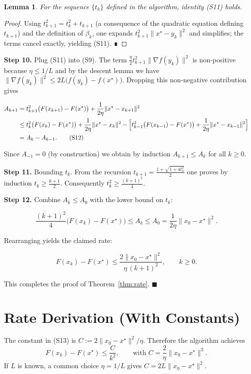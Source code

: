 \documentclass{article}
\newtheorem{lemma}{Lemma}
\begin{document}
\begin{lemma}\label{lem:aux}
For the sequence $\{t_k\}$ defined in the algorithm, identity (S11) holds.
\end{lemma}
\begin{proof}
Using $t_{k+1}^{2}=t_k^{2}+t_{k+1}$ (a consequence of the quadratic equation defining $t_{k+1}$) and the definition of $\beta_k$, one expands $t_{k+1}^{2}\|x^\star-y_k\|^{2}$ and simplifies; the terms cancel exactly, yielding (S11).  ∎
\end{proof}

\noindent\textbf{Step 10.} Plug (S11) into (S9).  The term $\frac{\eta}{2}t_{k+1}^{2}\|\nabla f(y_k)\|^{2}$ is non‑positive because $\eta\le 1/L$ and by the descent lemma we have $\|\nabla f(y_k)\|^{2}\le 2L\bigl(f(y_k)-f(x^\star)\bigr)$.  Dropping this non‑negative contribution gives

\[
\begin{aligned}
A_{k+1}
&=t_{k+1}^{2}\bigl(F(x_{k+1})-F(x^\star)\bigr)
   +\frac{1}{2\eta}\|x^\star-x_{k+1}\|^{2}\\
&\le t_k^{2}\bigl(F(x_k)-F(x^\star)\bigr)
   +\frac{1}{2\eta}\|x^\star-x_k\|^{2}
   -\Bigl[t_{k-1}^{2}\bigl(F(x_{k-1})-F(x^\star)\bigr)
   +\frac{1}{2\eta}\|x^\star-x_{k-1}\|^{2}\Bigr] \\
&= A_k - A_{k-1}. \tag{S12}
\end{aligned}
\]

Since $A_{-1}=0$ (by construction) we obtain by induction $A_{k+1}\le A_k$ for all $k\ge0$.

\noindent\textbf{Step 11.} Bounding $t_k$.  From the recursion $t_{k+1}=\frac{1+\sqrt{1+4t_k^{2}}}{2}$ one proves by induction $t_k\ge \frac{k+1}{2}$.  Consequently $t_k^{2}\ge \frac{(k+1)^{2}}{4}$.

\noindent\textbf{Step 12.} Combine $A_k\le A_0$ with the lower bound on $t_k$:

\[
\frac{(k+1)^{2}}{4}\bigl(F(x_k)-F(x^\star)\bigr)
\le A_k\le A_0=\frac{1}{2\eta}\|x_0-x^\star\|^{2}.
\]

Rearranging yields the claimed rate:

\[
F(x_k)-F(x^\star)\le\frac{2\|x_0-x^\star\|^{2}}{\eta\,(k+1)^{2}},\qquad k\ge0. \tag{S13}
\]

This completes the proof of Theorem~\ref{thm:rate}. \hfill $\blacksquare$

\section*{Rate Derivation (With Constants)}
The constant in (S13) is $C:=2\|x_0-x^\star\|^{2}/\eta$.  Therefore the algorithm achieves
\[
\boxed{F(x_k)-F(x^\star)\le \dfrac{C}{k^{2}}},\qquad\text{with }C= \frac{2}{\eta}\|x_0-x^\star\|^{2}.
\]
If $L$ is known, a common choice $\eta=1/L$ gives $C=2L\|x_0-x^\star\|^{2}$.
\end{document}
